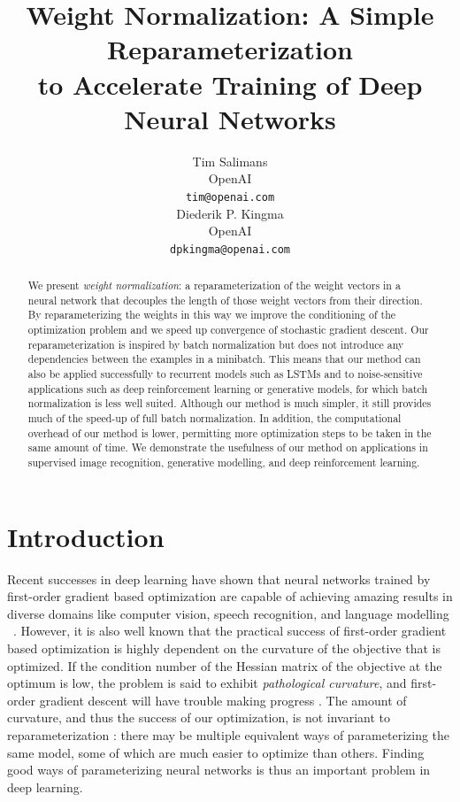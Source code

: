 \documentclass{article}
\title{Weight Normalization: A Simple Reparameterization \\ to Accelerate Training of Deep Neural Networks}
\author{
  Tim Salimans\\
  OpenAI\\
  \texttt{tim@openai.com}\\
	\And
	Diederik P. Kingma\\
  OpenAI\\
  \texttt{dpkingma@openai.com}\\
}
\begin{document}

\maketitle

\begin{abstract}
We present \emph{weight normalization}: a reparameterization of the weight vectors in a neural network that decouples the length of those weight vectors from their direction. By reparameterizing the weights in this way we improve the conditioning of the optimization problem and we speed up convergence of stochastic gradient descent. Our reparameterization is inspired by batch normalization but does not introduce any dependencies between the examples in a minibatch. This means that our method can also be applied successfully to recurrent models such as LSTMs and to noise-sensitive applications such as deep reinforcement learning or generative models, for which batch normalization is less well suited. Although our method is much simpler, it still provides much of the speed-up of full batch normalization. In addition, the computational overhead of our method is lower, permitting more optimization steps to be taken in the same amount of time. We demonstrate the usefulness of our method on applications in supervised image recognition, generative modelling, and deep reinforcement learning.
\end{abstract}

\section{Introduction}
Recent successes in deep learning have shown that neural networks trained by first-order gradient based optimization are capable of achieving amazing results in diverse domains like computer vision, speech recognition, and language modelling ~\cite{Goodfellow-et-al-2016-Book}. However, it is also well known that the practical success of first-order gradient based optimization is highly dependent on the curvature of the objective that is optimized. If the condition number of the Hessian matrix of the objective at the optimum is low, the problem is said to exhibit \emph{pathological curvature}, and first-order gradient descent will have trouble making progress \cite{martens2010deep,sutskever2013importance}. The amount of curvature, and thus the success of our optimization, is not invariant to reparameterization \cite{amaring}: there may be multiple equivalent ways of parameterizing the same model, some of which are much easier to optimize than others. Finding good ways of parameterizing neural networks is thus an important problem in deep learning.
\end{document}
